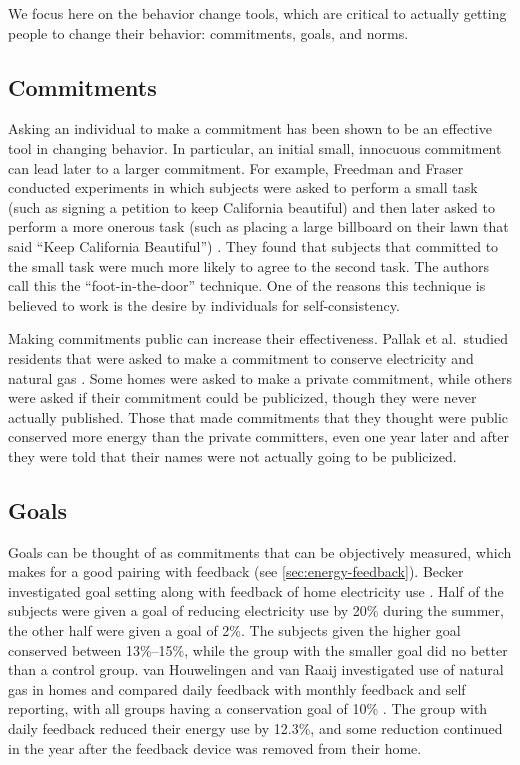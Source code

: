 We focus here on the behavior change tools, which are critical to actually getting people to change their behavior: commitments, goals, and norms.

\subsection{Commitments}
\label{sec:rl-commitments}

Asking an individual to make a commitment has been shown to be an effective tool in changing behavior. In particular, an initial small, innocuous commitment can lead later to a larger commitment. For example, Freedman and Fraser conducted experiments in which subjects were asked to perform a small task (such as signing a petition to keep California beautiful) and then later asked to perform a more onerous task (such as placing a large billboard on their lawn that said ``Keep California Beautiful'') \cite{Freedman66}. They found that subjects that committed to the small task were much more likely to agree to the second task. The authors call this the ``foot-in-the-door'' technique. One of the reasons this technique is believed to work is the desire by individuals for self-consistency.

Making commitments public can increase their effectiveness. Pallak et al.\ studied residents that were asked to make a commitment to conserve electricity and natural gas \cite{Pallak80}. Some homes were asked to make a private commitment, while others were asked if their commitment could be publicized, though they were never actually published. Those that made commitments that they thought were public conserved more energy than the private committers, even one year later and after they were told that their names were not actually going to be publicized.

\subsection{Goals}
\label{sec:goals}

Goals can be thought of as commitments that can be objectively measured, which makes for a good pairing with feedback (see \autoref{sec:energy-feedback}). Becker investigated goal setting along with feedback of home electricity use \cite{Becker78}. Half of the subjects were given a goal of reducing electricity use by 20\% during the summer, the other half were given a goal of 2\%. The subjects given the higher goal conserved between 13\%--15\%, while the group with the smaller goal did no better than a control group. van Houwelingen and van Raaij investigated use of natural gas in homes and compared daily feedback with monthly feedback and self reporting, with all groups having a conservation goal of 10\% \cite{Houwelingen89}. The group with daily feedback reduced their energy use by 12.3\%, and some reduction continued in the year after the feedback device was removed from their home.

